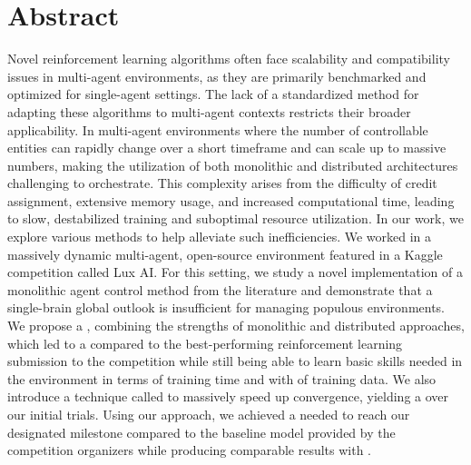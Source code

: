 \clearpage
{}
\chapter*{\centering Abstract}
\label{ch:abst}

\noindent Novel reinforcement learning algorithms often face scalability and compatibility issues in multi-agent environments, as they are primarily benchmarked and optimized for single-agent settings. The lack of a standardized method for adapting these algorithms to multi-agent contexts restricts their broader applicability. In multi-agent environments where the number of controllable entities can rapidly change over a short timeframe and can scale up to massive numbers, making the utilization of both monolithic and distributed architectures challenging to orchestrate. This complexity arises from the difficulty of credit assignment, extensive memory usage, and increased computational time, leading to slow, destabilized training and suboptimal resource utilization. In our work, we explore various methods to help alleviate such inefficiencies. We worked in a massively dynamic multi-agent, open-source environment featured in a Kaggle competition called Lux AI. For this setting, we study a novel implementation of a monolithic agent control method from the literature and demonstrate that a single-brain global outlook is insufficient for managing populous environments. We propose a , combining the strengths of monolithic and distributed approaches, which led to a  compared to the best-performing reinforcement learning submission to the competition while still being able to learn basic skills needed in the environment  in terms of training time and with  of training data. We also introduce a technique called  to massively speed up convergence, yielding a  over our initial trials. Using our approach, we achieved a  needed to reach our designated milestone compared to the baseline model provided by the competition organizers while producing comparable results with .

\restoregeometry


